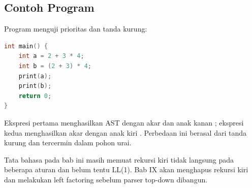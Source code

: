\subsection{Contoh Program}

Program  menguji prioritas dan tanda kurung:
\begin{lstlisting}[language=C]
int main() {
    int a = 2 + 3 * 4;
    int b = (2 + 3) * 4;
    print(a);
    print(b);
    return 0;
}
\end{lstlisting}
Ekspresi pertama menghasilkan AST dengan akar \code{+} dan anak
kanan \code{*}; ekspresi kedua menghasilkan akar \code{*} dengan
anak kiri \code{+}. Perbedaan ini berasal dari tanda kurung dan
tercermin dalam pohon urai.

\begin{warningbox}
Tata bahasa pada bab ini masih memuat rekursi kiri tidak langsung
pada beberapa aturan dan belum tentu LL(1). Bab IX akan menghapus
rekursi kiri dan melakukan left factoring sebelum parser top-down
dibangun.
\end{warningbox}
